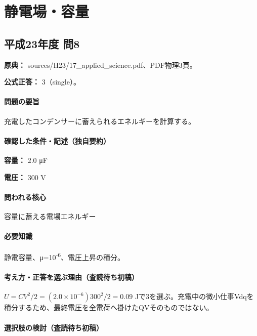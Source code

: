 \section{静電場・容量}

\subsection{平成23年度 問8}
\label{q:h23-reg-applied-08}

\noindent\textbf{原典：} sources/H23/17\_applied\_science.pdf、PDF物理3頁。

\textbf{公式正答：} 3（single）。

\paragraph{問題の要旨} 充電したコンデンサーに蓄えられるエネルギーを計算する。

\paragraph{確認した条件・記述（独自要約）}\mbox{}\par

\noindent\textbf{容量：} 2.0 μF\par

\noindent\textbf{電圧：} 300 V\par

\paragraph{問われる核心} 容量に蓄える電場エネルギー

\paragraph{必要知識} 静電容量、μ=10\textsuperscript{-6}、電圧上昇の積分。

\paragraph{考え方・正答を選ぶ理由（査読待ち初稿）} \(U=CV^2/2=(2.0\times10^{-6})300^2/2=0.09\) Jで3を選ぶ。充電中の微小仕事Vdqを積分するため、最終電圧を全電荷へ掛けたQVそのものではない。

\paragraph{選択肢の検討（査読待ち初稿）}\mbox{}\par

